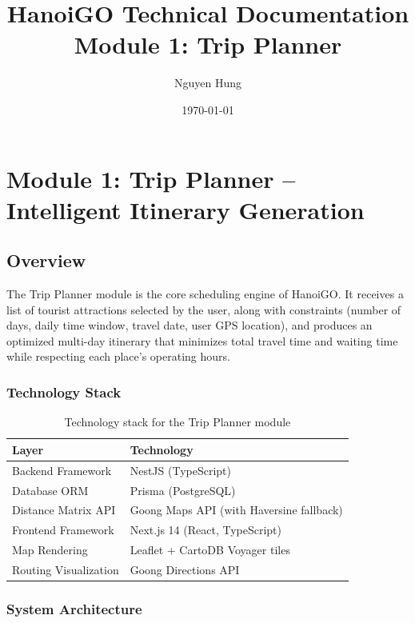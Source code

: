\documentclass[12pt,a4paper]{report}
\begin{document}
\title{HanoiGO Technical Documentation \\ \large Module 1: Trip Planner}
\author{Nguyen Hung}
\date{\today}
\maketitle

\chapter{Module 1: Trip Planner -- Intelligent Itinerary Generation}
\label{chap:trip-planner}

\section{Overview}

The Trip Planner module is the core scheduling engine of HanoiGO. It receives a list of tourist attractions selected by the user, along with constraints (number of days, daily time window, travel date, user GPS location), and produces an optimized multi-day itinerary that minimizes total travel time and waiting time while respecting each place's operating hours.

\subsection{Technology Stack}

\begin{table}[H]
\centering
\begin{tabular}{|l|l|}
\hline
\textbf{Layer} & \textbf{Technology} \\
\hline
Backend Framework & NestJS (TypeScript) \\
Database ORM & Prisma (PostgreSQL) \\
Distance Matrix API & Goong Maps API (with Haversine fallback) \\
Frontend Framework & Next.js 14 (React, TypeScript) \\
Map Rendering & Leaflet + CartoDB Voyager tiles \\
Routing Visualization & Goong Directions API \\
\hline
\end{tabular}
\caption{Technology stack for the Trip Planner module}
\end{table}

\subsection{System Architecture}
\end{document}
